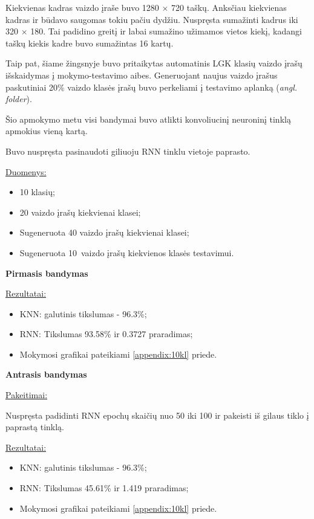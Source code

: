\documentclass{VUMIFPSbakalaurinis}
\begin{document}
Kiekvienas kadras vaizdo įraše buvo 1280 $\times$ 720 taškų. Anksčiau kiekvienas kadras ir būdavo saugomas tokiu pačiu dydžiu. Nuspręsta sumažinti kadrus iki 320 $\times$ 180. Tai padidino greitį ir labai sumažino užimamos vietos kiekį, kadangi taškų kiekis kadre buvo sumažintas 16 kartų.

Taip pat, šiame žingsnyje buvo pritaikytas automatinis LGK klasių vaizdo įrašų išskaidymas į mokymo-testavimo aibes. Generuojant naujus vaizdo įrašus paskutiniai 20\% vaizdo klasės įrašų buvo perkeliami į testavimo aplanką (\textit{angl. folder}).

Šio apmokymo metu visi bandymai buvo atlikti konvoliucinį neuroninį tinklą apmokius vieną kartą.

Buvo nuspręsta pasinaudoti giliuoju RNN tinklu vietoje paprasto.

\underline{Duomenys:}

\begin{itemize}
	\item 10 klasių;
	\item 20 vaizdo įrašų kiekvienai klasei;
	\item Sugeneruota 40 vaizdo įrašų kiekvienai klasei;
	\item Sugeneruota 10 vaizdo įrašų kiekvienos klasės testavimui.
\end{itemize}

\bigbreak
\textbf{Pirmasis bandymas}

\underline{Rezultatai:}
\begin{itemize}
	\item KNN: galutinis tikslumas - 96.3\%;
	\item RNN: Tikslumas 93.58\% ir 0.3727 praradimas;
	\item Mokymosi grafikai pateikiami \ref{appendix:10kl} priede.
\end{itemize}

\bigbreak
\textbf{Antrasis bandymas}

\underline{Pakeitimai:}

Nuspręsta padidinti RNN epochų skaičių nuo 50 iki 100 ir pakeisti iš gilaus tiklo į paprastą tinklą.

\underline{Rezultatai:}
\begin{itemize}
	\item KNN: galutinis tikslumas - 96.3\%;
	\item RNN: Tikslumas 45.61\% ir 1.419 praradimas;
	\item Mokymosi grafikai pateikiami \ref{appendix:10kl} priede.
\end{itemize}
\end{document}
